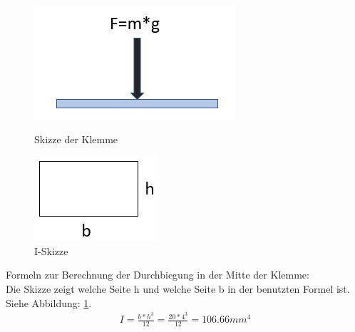 \begin{figure}[H]
   \begin{minipage}[hbt]{.4\linewidth} %
      \includegraphics[width=\linewidth]{Bilder/Powerpoint/Flaechenkraft}
      \caption{Skizze der Klemme}
      \label{SkizzeKlemme} 
   \end{minipage}
   \hspace{.2\linewidth}%
   \begin{minipage}[hbt]{.3\linewidth} %
      \includegraphics[width=\linewidth]{Bilder/Powerpoint/IBerechnung}
      \caption{I-Skizze}
      \label{I_Skizze}
   \end{minipage}
\end{figure}

Formeln zur Berechnung der Durchbiegung in der Mitte der Klemme: \\

Die Skizze zeigt welche Seite h und welche Seite b in der benutzten Formel ist. Siehe Abbildung: \ref{I_Skizze}.
\begin{align*}
I = \frac{b*h^{3}}{12} = \frac{20*4^{3}}{12} = 106.66mm^{4} 
\end{align*}

